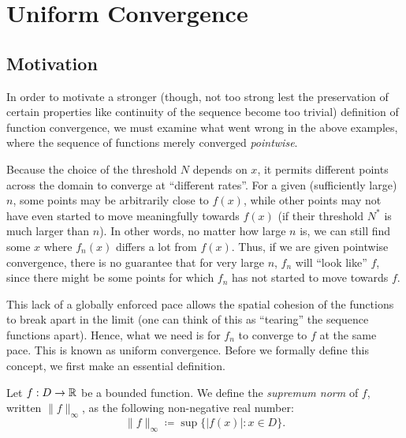 \documentclass[../analysis1.tex]{subfiles}
\begin{document}
\section{Uniform Convergence}

\subsection{Motivation}

In order to motivate a stronger (though, not too strong lest the preservation of certain properties like continuity of the sequence become too trivial) definition of function convergence, we must examine what went wrong in the above examples, where the sequence of functions merely converged \textit{pointwise}.

Because the choice of the threshold $N$ depends on $x$, it permits different points across the domain to converge at ``different rates''. For a given (sufficiently large) $n$, some points may be arbitrarily close to $f(x)$, while other points may not have even started to move meaningfully towards $f(x)$ (if their threshold $N^*$ is much larger than $n$).
In other words, no matter how large $n$ is, we can still find some $x$ where $f_n(x)$ differs a lot from $f(x)$. Thus, if we are given pointwise convergence, there is no guarantee that for very large $n$, $f_n$ will ``look like'' $f$, since there might be some points for which $f_n$ has not started to move towards $f$.

This lack of a globally enforced pace allows the spatial cohesion of the functions to break apart in the limit (one can think of this as ``tearing'' the sequence functions apart).
Hence, what we need is for $f_n$ to converge to $f$ at the same pace. This is known as uniform convergence. Before we formally define this concept, we first make an essential definition.

\begin{definition}
    \begin{shaded*}
        Let $f:D\to\mathbb{R}$ be a bounded function. We define the \textit{supremum norm} of $f$, written $\|f\|_{\infty}$, as the following non-negative real number:
        \[\|f\|_\infty\coloneqq \sup\{|f(x)|:x\in D\}.\]
    \end{shaded*}
\end{definition}
\end{document}
